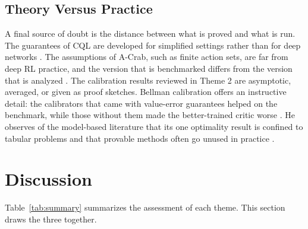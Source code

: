 \documentclass[journal]{IEEEtran}
\begin{document}
\subsection{Theory Versus Practice}
A final source of doubt is the distance between what is proved and what is run. The guarantees of CQL are developed for simplified settings rather than for deep networks \cite{kumar2020cql}. The assumptions of A-Crab, such as finite action sets, are far from deep RL practice, and the version that is benchmarked differs from the version that is analyzed \cite{zhu2023acrab}. The calibration results reviewed in Theme 2 are asymptotic, averaged, or given as proof sketches. Bellman calibration offers an instructive detail: the calibrators that came with value-error guarantees helped on the benchmark, while those without them made the better-trained critic worse \cite{vanderlaan2026bellman}. He observes of the model-based literature that its one optimality result is confined to tabular problems and that provable methods often go unused in practice \cite{he2023survey}.

\section{Discussion}
\label{sec:discussion}
Table~\ref{tab:summary} summarizes the assessment of each theme. This section draws the three together.
\end{document}
